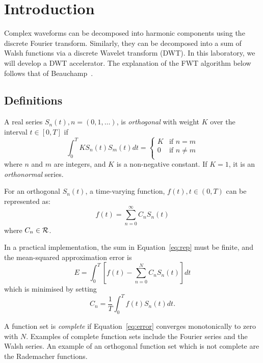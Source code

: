 
\section{Introduction}
Complex waveforms can be decomposed into harmonic components using
the discrete Fourier transform. Similarly, they can be decomposed
into a sum of Walsh functions via a discrete Wavelet transform
(DWT).  In this laboratory, we will develop a DWT accelerator.
The explanation of the FWT algorithm below follows that of Beauchamp~\cite{beauchamp1975walsh}.

\subsection{Definitions}
A real series $S_n(t), n=(0,1,\ldots)$, is {\em orthogonal} 
with weight $K$ over the interval $t \in [0, T]$ if
\begin{equation}
\int_0^T K S_n(t) S_m(t) dt = \begin{cases}
K & \text{if $n=m$}\\
0 & \text{if $n \ne m$}\\
\end{cases}
\end{equation}
where $n$ and $m$ are integers, and $K$ is a non-negative constant.
If $K = 1$, it is an {\em orthonormal} series.

For an orthogonal $S_n(t)$, a time-varying function, $f(t), t \in (0,T)$ 
can be represented as:
\begin{equation}
f(t) = \sum_{n=0}^\infty C_n S_n(t)
\label{eq:rep}
\end{equation}
where $C_n \in \cal{R}$.

In a practical implementation, the sum in Equation~\ref{eq:rep} must
be finite, and the mean-squared approximation error is
\begin{equation}
E = \int_0^T [f(t) - \sum_{n=0}^N C_n S_n(t)] dt
\label{eq:error}
\end{equation}
which is minimised by setting
\begin{equation}
C_n = \frac{1}{T} \int_0^T f(t) S_n(t) dt.
\end{equation}

A function set is {\em complete} if Equation~\ref{eq:error} converges
monotonically to zero with $N$. Examples of complete function sets
include the Fourier series and the Walsh series. An example of an
orthogonal function set which is not complete are the Rademacher
functions.

